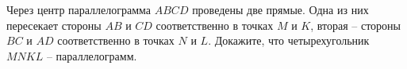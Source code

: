 \begin{ex}
	\begin{condition}
		Через центр параллелограмма \( ABCD  \) проведены две прямые. Одна из них пересекает стороны \( AB  \) и \( CD  \) соответственно в точках \( M  \) и \( K \), вторая  – стороны \( BC \) и \( AD  \) соответственно в точках \( N  \) и \( L \). Докажите, что четырехугольник \( MNKL  \) – параллелограмм.
	\end{condition}
\end{ex}